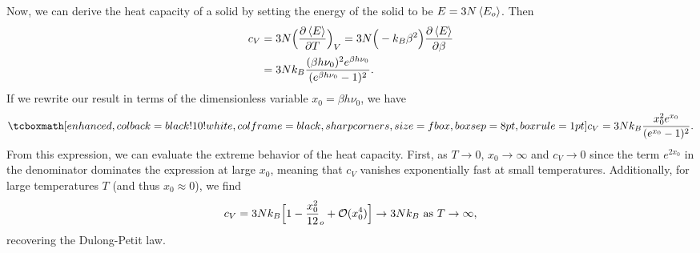 {Now, we can derive the heat capacity of a solid by setting the energy of the solid to be $E = 3 N \expval{E_o}$.
Then
\begin{eqnarray}
    \begin{aligned}
        c_{V} &= 3N \Big( \pdv{\expval{E}}{T} \Big)_{V} = 3N \Big( -k_{B} \beta^2 \Big) \pdv{\expval{E}}{\beta} \\
              &= 3 N k_{B} \frac{(\beta h \nu_0)^2 e^{\beta h \nu_0}}{(e^{\beta h \nu_0} - 1)^2}
    .\end{aligned}
\end{eqnarray}
If we rewrite our result in terms of the dimensionless variable $x_0 = \beta h \nu_0$, we have
\begin{eqnarray}
    \eqbox{ c_{V} = 3 N k_{B} \frac{x_0^2 e^{x_0}}{(e^{x_0} - 1)^2} }
.\end{eqnarray}
From this expression, we can evaluate the extreme behavior of the heat capacity.
First, as $T \rightarrow 0$, $x_0 \rightarrow \infty$ and $c_{V} \rightarrow 0$ since the term $e^{2x_0}$ in the denominator dominates the expression at large $x_0$, meaning that $c_{V}$ vanishes exponentially fast at small temperatures.
Additionally, for large temperatures $T$ (and thus $x_0 \approx 0$), we find
\begin{eqnarray}
    c_{V} = 3Nk_{B} \Big[ 1 - \frac{x_0^2}{12}_o + {\cal O}(x_0^{4}) \Big] \rightarrow 3 N k_{B} ~{\rm as}~ T \rightarrow \infty
,\end{eqnarray}
recovering the Dulong-Petit law.

}
